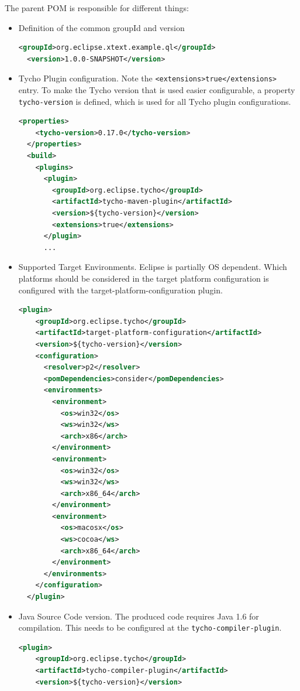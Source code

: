 The parent POM is responsible for different things:
\begin{itemize}
\item Definition of the common groupId and version
\begin{lstlisting}[language=XML]
  <groupId>org.eclipse.xtext.example.ql</groupId>
  <version>1.0.0-SNAPSHOT</version>
\end{lstlisting}
\item Tycho Plugin configuration. Note the
\texttt{<extensions>true</extensions>} entry. To make the Tycho version that is
used easier configurable, a property \texttt{tycho-version} is defined, which is used for
all Tycho plugin configurations.
\begin{lstlisting}[language=XML]
  <properties>
    <tycho-version>0.17.0</tycho-version>
  </properties>
  <build>
    <plugins>
      <plugin>
        <groupId>org.eclipse.tycho</groupId>
        <artifactId>tycho-maven-plugin</artifactId>
        <version>${tycho-version}</version>
        <extensions>true</extensions>
      </plugin>
      ...
\end{lstlisting}
\item Supported Target Environments. Eclipse is partially OS dependent. Which
platforms should be considered in the target platform configuration is
configured with the target-platform-configuration plugin.
\begin{lstlisting}[language=XML]
  <plugin>
    <groupId>org.eclipse.tycho</groupId>
    <artifactId>target-platform-configuration</artifactId>
    <version>${tycho-version}</version>
    <configuration>
      <resolver>p2</resolver>
      <pomDependencies>consider</pomDependencies>
      <environments>
        <environment>
          <os>win32</os>
          <ws>win32</ws>
          <arch>x86</arch>
        </environment>
        <environment>
          <os>win32</os>
          <ws>win32</ws>
          <arch>x86_64</arch>
        </environment>
        <environment>
          <os>macosx</os>
          <ws>cocoa</ws>
          <arch>x86_64</arch>
        </environment>
      </environments>
    </configuration>
  </plugin>
\end{lstlisting}
\item Java Source Code version. The produced code requires Java 1.6 for
compilation. This needs to be configured at the \texttt{tycho-compiler-plugin}.
\begin{lstlisting}[language=XML]
  <plugin>
    <groupId>org.eclipse.tycho</groupId>
    <artifactId>tycho-compiler-plugin</artifactId>
    <version>${tycho-version}</version>

\end{lstlisting}
\end{itemize}
